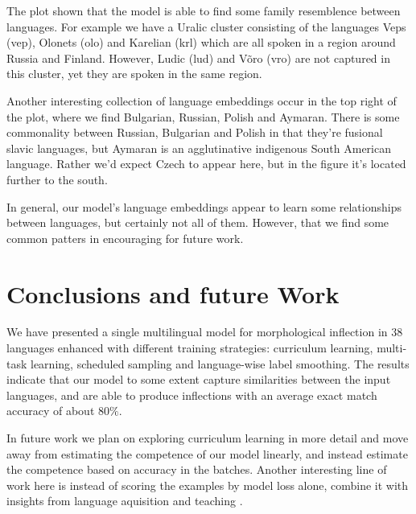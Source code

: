 \documentclass[11pt,a4paper]{article}
\begin{document}
The plot shown that the model is able to find some family resemblence
between languages. For example we have a Uralic cluster consisting of
the languages Veps (vep), Olonets (olo) and Karelian (krl) which are
all spoken in a region around Russia and Finland. However, Ludic (lud)
and V\~{o}ro (vro) are not captured in this cluster, yet they are
spoken in the same region.

Another interesting collection of language embeddings occur in the top
right of the plot, where we find Bulgarian, Russian, Polish and
Aymaran. There is some commonality between Russian, Bulgarian and
Polish in that they're fusional slavic languages, but Aymaran is an
agglutinative indigenous South American language. Rather we'd expect
Czech to appear here, but in the figure it's located further to the
south. 

In general, our model's language embeddings appear to learn some
relationships between languages, but certainly not all of
them. However, that we find some common patters in encouraging for
future work.



\section{Conclusions and future Work}

We have presented a single multilingual model for morphological
inflection in $38$ languages enhanced with different training
strategies: curriculum learning, multi-task learning, scheduled
sampling and language-wise label smoothing.  
The results indicate that our model to some extent capture
similarities between the input languages, and are able to produce
inflections with an average exact match accuracy of about $80\%$. 

In future work we plan on exploring curriculum learning in more detail
and move away from estimating the competence of our model linearly,
and instead estimate the competence based on accuracy in the
batches. Another interesting line of work here is instead of scoring
the examples by model loss alone, combine it with insights from language aquisition and teaching \cite{ionin2002easier, slabakova2010easy}.
\end{document}
